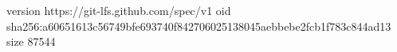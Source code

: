 version https://git-lfs.github.com/spec/v1
oid sha256:a60651613c56749bfe693740f842706025138045aebbebe2fcb1f783c844ad13
size 87544
